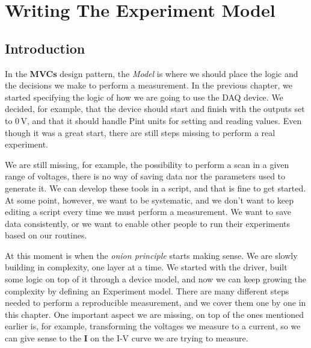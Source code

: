 \chapter{Writing The Experiment Model}\label{ch:experiment-model}

\section{Introduction}\label{sec:experiment-model-introduction}
In the \textbf{MVCs} design pattern, the \emph{Model} is where we should place the logic and the decisions we make to perform a measurement. In the previous chapter, we started specifying the logic of how we are going to use the DAQ device. We decided, for example, that the device should start and finish with the outputs set to $0\,\textrm{V}$, and that it should handle Pint units for setting and reading values. Even though it was a great start, there are still steps missing to perform a real experiment.

We are still missing, for example, the possibility to perform a scan in a given range of voltages, there is no way of saving data nor the parameters used to generate it. We can develop these tools in a script, and that is fine to get started. At some point, however, we want to be systematic, and we don't want to keep editing a script every time we must perform a measurement. We want to save data consistently, or we want to enable other people to run their experiments based on our routines.

At this moment is when the \emph{onion principle} starts making sense. We are slowly building in complexity, one layer at a time. We started with the driver, built some logic on top of it through a device model, and now we can keep growing the complexity by defining an Experiment model. There are many different steps needed to perform a reproducible measurement, and we cover them one by one in this chapter. One important aspect we are missing, on top of the ones mentioned earlier is, for example, transforming the voltages we measure to a current, so we can give sense to the \textbf{I} on the I-V curve we are trying to measure.


